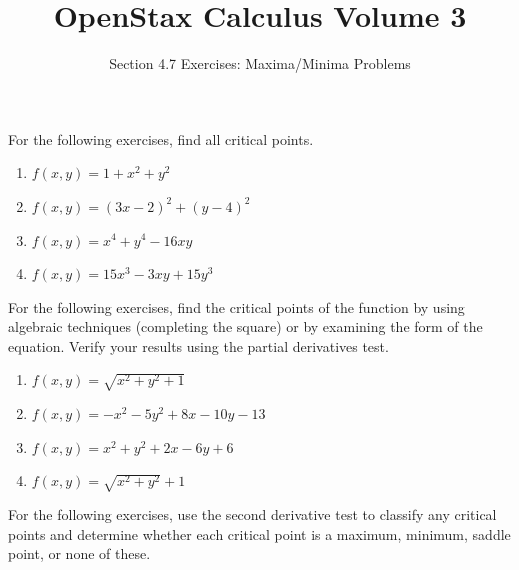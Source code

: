 \documentclass{exercises}
\title{OpenStax Calculus Volume 3}
\subtitle{Section 4.7 Exercises: Maxima/Minima Problems}
\author{}
\date{}
\begin{document}
\maketitle


For the following exercises, find all critical points.

\begin{enumerate}[start=1]
\item $f(x,y)=1+x^{2}+y^{2}$
\item $f(x,y)={(3x-2)}^{2}+{(y-4)}^{2}$
\item $f(x,y)=x^{4}+y^{4}-16xy$
\item $f(x,y)=15x^{3}-3xy+15y^{3}$
\end{enumerate}

For the following exercises, find the critical points of the function by using algebraic techniques (completing the square) or by examining the form of the equation. Verify your results using the partial derivatives test.

\begin{enumerate}[resume]
\item $f(x,y)=\sqrt{x^{2}+y^{2}+1}$
\item $f(x,y)=-x^{2}-5y^{2}+8x-10y-13$
\item $f(x,y)=x^{2}+y^{2}+2x-6y+6$
\item $f(x,y)=\sqrt{x^{2}+y^{2}}+1$
\end{enumerate}

For the following exercises, use the second derivative test to classify any critical points and determine whether each critical point is a maximum, minimum, saddle point, or none of these.
\end{document}
